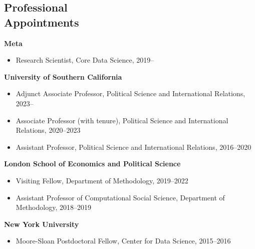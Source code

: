 \documentclass[margin,line,11pt]{resume}
\begin{document}
\begin{resume}
    \section{\mysidestyle Professional\\Appointments}
    \textbf{Meta}
    \begin{itemize}
    \item[] Research Scientist, Core Data Science, 2019--
    \end{itemize}
    \vspace{-.15cm}      
    \textbf{University of Southern California}
    \begin{itemize}
    \item[] Adjunct Associate Professor, Political Science and International Relations, 2023--
    \vspace{-.15cm}        
    \item[] Associate Professor (with tenure), Political Science and International Relations, 2020--2023
    \vspace{-.15cm}    
    \item[] Assistant Professor, Political Science and International Relations, 2016--2020
    \end{itemize}    
    \vspace{-.15cm}    
    \textbf{London School of Economics and Political Science}
    \begin{itemize}
    \item[] Visiting Fellow, Department of Methodology, 2019--2022
    \vspace{-.15cm}    
    \item[] Assistant Professor of Computational Social Science, Department of Methodology, 2018--2019
    \end{itemize}
    \vspace{-.30cm}
    \textbf{New York University}
    \begin{itemize}
    \item[] Moore-Sloan Postdoctoral Fellow, Center for Data Science, 2015--2016
    \end{itemize}
        

\end{resume}
\end{document}
